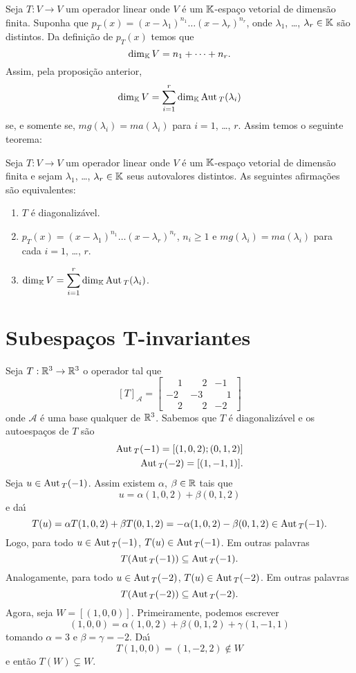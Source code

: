 Seja $T : V \to V$ um operador linear onde $V$ \'e um $\mathbb{K}$-espa\c{c}o vetorial de dimens\~ao finita. Suponha que $p_T(x) = (x - \lambda_1)^{n_1}\dots(x - \lambda_r)^{n_r}$, onde $\lambda_1$, \dots, $\lambda_r \in \mathbb{K}$ s\~ao distintos. Da defini\c{c}\~ao de $p_T(x)$ temos que
\[
    \dim_{\mathbb{K}}V = n_1 + \cdots + n_r.
\]
Assim, pela proposi\c{c}\~ao anterior,
\[
    \dim_{\mathbb{K}}V = \sum_{i = 1}^r \dim_{\mathbb{K}}{\rm Aut\,}_T(\lambda_i)
\]
se, e somente se, $mg(\lambda_i) = ma(\lambda_i)$ para $i = 1$, \dots, $r$. Assim temos o seguinte teorema:
\begin{teorema}
    Seja $T : V \to V$ um operador linear onde $V$ \'e um $\mathbb{K}$-espa\c{c}o vetorial de dimens\~ao finita e sejam $\lambda_1$, \dots, $\lambda_r \in \mathbb{K}$ seus autovalores distintos. As seguintes afirma\c{c}\~oes s\~ao equivalentes:
    \begin{enumerate}[label={\roman*})]
        \item $T$ \'e diagonaliz\'avel.
        \item $p_T(x) = (x - \lambda_1)^{n_1}\dots(x - \lambda_r)^{n_r}$, $n_i \ge 1$ e $mg(\lambda_i) = ma(\lambda_i)$ para cada $i = 1$, \dots, $r$.
        \item $\dim_{\mathbb{K}}V = \displaystyle\sum_{i = 1}^r \dim_{\mathbb{K}}{\rm Aut\,}_T(\lambda_i)$.
    \end{enumerate}
\end{teorema}

\section{Subespa\c{c}os T-invariantes} %
\label{sec:subespacos_T-invariantes}
Seja $T : \mathbb{R}^3 \to \mathbb{R}^3$ o operador tal que
        \[
    [T]_\mathcal{A} = \begin{bmatrix}
            \phantom{-}1 & \phantom{-}2 & -1\\
            -2 & -3 & \phantom{-}1\\
            \phantom{-}2 & \phantom{-}2 & -2
        \end{bmatrix}
        \]
onde $\mathcal{A}$ \'e uma base qualquer de $\mathbb{R}^3$. Sabemos que $T$ \'e diagonaliz\'avel e os autoespa\c{c}os de $T$ s\~ao
\begin{align*}
    {\rm Aut\,}_T(-1) = [(1,0,2); (0,1,2)]\\
    {\rm Aut\,}_T(-2) = [(1,-1,1)].
\end{align*}
Seja $u \in {\rm Aut\,}_T(-1)$. Assim existem $\alpha$, $\beta \in \mathbb{R}$ tais que
\[
    u = \alpha(1,0,2) + \beta(0,1,2)
\]
e da{\'\i}
\[
    T(u) = \alpha T(1,0,2) + \beta T(0,1,2) = -\alpha(1,0,2) - \beta(0,1,2) \in {\rm Aut\,}_T(-1).
\]
Logo, para todo $u \in {\rm Aut\,}_T(-1)$, $T(u) \in {\rm Aut\,}_T(-1)$. Em outras palavras
\[
    T({\rm Aut\,}_T(-1)) \subseteq {\rm Aut\,}_T(-1).
\]
Analogamente, para todo $u \in {\rm Aut\,}_T(-2)$, $T(u) \in {\rm Aut\,}_T(-2)$. Em outras palavras
\[
    T({\rm Aut\,}_T(-2)) \subseteq {\rm Aut\,}_T(-2).
\]
Agora, seja $W = [(1,0,0)]$. Primeiramente, podemos escrever
\[
    (1,0,0) = \alpha(1,0,2) + \beta(0,1,2) + \gamma(1,-1,1)
\]
tomando $\alpha = 3$ e $\beta = \gamma = -2$. Da{\'\i}
\[
    T(1,0,0) = (1,-2,2) \notin W
\]
e ent\~ao $T(W) \varsubsetneq W$.

